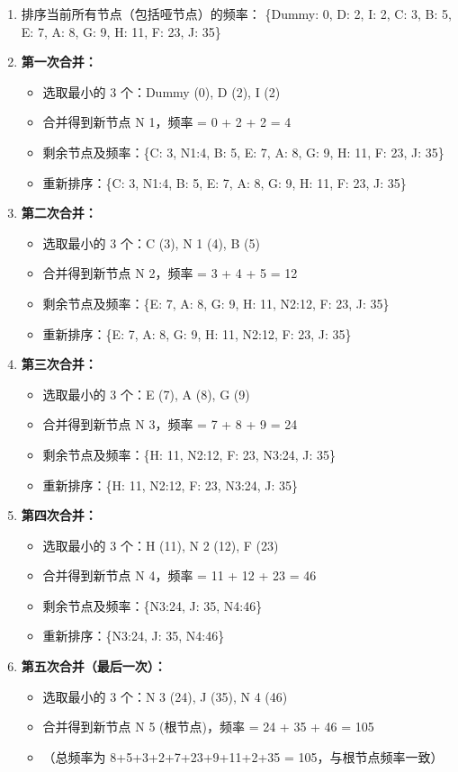 \begin{enumerate}
	\item 排序当前所有节点（包括哑节点）的频率：
\{Dummy: 0, D: 2, I: 2, C: 3, B: 5, E: 7, A: 8, G: 9, H: 11, F: 23, J: 35\}
	\item \textbf{第一次合并：}
	\begin{itemize}
		\item 选取最小的 3 个：Dummy (0), D (2), I (2)
		\item 合并得到新节点 N 1，频率 = 0 + 2 + 2 = 4
		\item 剩余节点及频率：\{C: 3, N1:4, B: 5, E: 7, A: 8, G: 9, H: 11, F: 23, J: 35\}
		\item 重新排序：\{C: 3, N1:4, B: 5, E: 7, A: 8, G: 9, H: 11, F: 23, J: 35\}
	\end{itemize}
	\item \textbf{第二次合并：}
	\begin{itemize}
		\item 选取最小的 3 个：C (3), N 1 (4), B (5)
		\item 合并得到新节点 N 2，频率 = 3 + 4 + 5 = 12
		\item 剩余节点及频率：\{E: 7, A: 8, G: 9, H: 11, N2:12, F: 23, J: 35\}
		\item 重新排序：\{E: 7, A: 8, G: 9, H: 11, N2:12, F: 23, J: 35\}
	\end{itemize}
	\item \textbf{第三次合并：}
	\begin{itemize}
		\item 选取最小的 3 个：E (7), A (8), G (9)
		\item 合并得到新节点 N 3，频率 = 7 + 8 + 9 = 24
		\item 剩余节点及频率：\{H: 11, N2:12, F: 23, N3:24, J: 35\}
		\item 重新排序：\{H: 11, N2:12, F: 23, N3:24, J: 35\}
	\end{itemize}
	\item \textbf{第四次合并：}
	\begin{itemize}
		\item 选取最小的 3 个：H (11), N 2 (12), F (23)
		\item 合并得到新节点 N 4，频率 = 11 + 12 + 23 = 46
		\item 剩余节点及频率：\{N3:24, J: 35, N4:46\}
		\item 重新排序：\{N3:24, J: 35, N4:46\}
	\end{itemize}
	\item \textbf{第五次合并（最后一次）：}
	\begin{itemize}
		\item 选取最小的 3 个：N 3 (24), J (35), N 4 (46)
		\item 合并得到新节点 N 5 (根节点)，频率 = 24 + 35 + 46 = 105
		\item （总频率为 8+5+3+2+7+23+9+11+2+35 = 105，与根节点频率一致）
	\end{itemize}
\end{enumerate}

